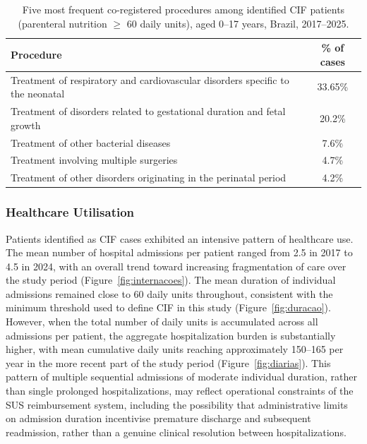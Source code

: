 \documentclass[12pt,a4paper]{article}
\theoremstyle{plain}
\theoremstyle{definition}
\theoremstyle{remark}
\begin{document}
\begin{table}[ht]
\centering
\caption{Five most frequent co-registered procedures among identified CIF patients (parenteral nutrition $\geq$ 60 daily units), aged 0--17 years, Brazil, 2017--2025.}
\label{tab:procedimentos}
\renewcommand{\arraystretch}{1.3}
\begin{tabular}{lc}
\toprule
Procedure & \% of cases \\
\midrule
Treatment of respiratory and cardiovascular disorders specific to the neonatal & 33.65\% \\
Treatment of disorders related to gestational duration and fetal growth & 20.2\% \\
Treatment of other bacterial diseases & 7.6\% \\
Treatment involving multiple surgeries & 4.7\% \\
Treatment of other disorders originating in the perinatal period & 4.2\% \\
\bottomrule
\end{tabular}
\end{table}

\subsubsection*{Healthcare Utilisation}

Patients identified as CIF cases exhibited an intensive pattern of healthcare use. The mean number of hospital admissions per patient ranged from 2.5 in 2017 to 4.5 in 2024, with an overall trend toward increasing fragmentation of care over the study period (Figure~\ref{fig:internacoes}). The mean duration of individual admissions remained close to 60 daily units throughout, consistent with the minimum threshold used to define CIF in this study (Figure~\ref{fig:duracao}). However, when the total number of daily units is accumulated across all admissions per patient, the aggregate hospitalization burden is substantially higher, with mean cumulative daily units reaching approximately 150--165 per year in the more recent part of the study period (Figure~\ref{fig:diarias}). This pattern of multiple sequential admissions of moderate individual duration, rather than single prolonged hospitalizations, may reflect operational constraints of the SUS reimbursement system, including the possibility that administrative limits on admission duration incentivise premature discharge and subsequent readmission, rather than a genuine clinical resolution between hospitalizations.
\end{document}
